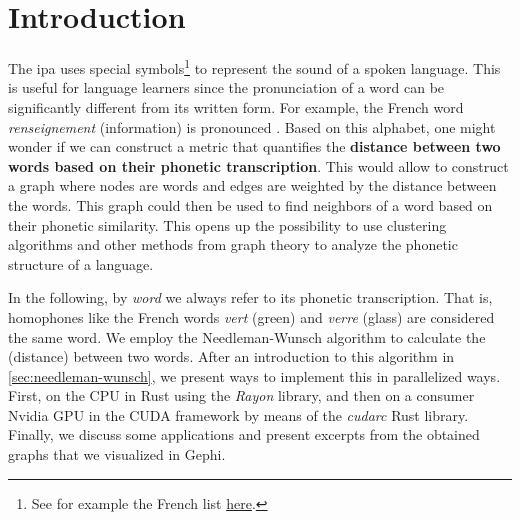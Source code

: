 \section{Introduction}

The \gls{ipa} uses special symbols\footnote{See for example the French list \href{https://en.wikipedia.org/wiki/Help:IPA/French}{here}.} to represent the sound of a spoken language. This is useful for language learners since the pronunciation of a word can be significantly different from its written form. For example, the French word \textit{renseignement} (information) is pronounced . Based on this alphabet, one might wonder if we can construct a metric that quantifies the \textbf{distance between two words based on their phonetic transcription}. This would allow to construct a graph where nodes are words and edges are weighted by the distance between the words. This graph could then be used to find neighbors of a word based on their phonetic similarity. This opens up the possibility to use clustering algorithms and other methods from graph theory to analyze the phonetic structure of a language.

In the following, by \textit{word} we always refer to its phonetic transcription. That is, homophones like the French words \textit{vert}  (green) and \textit{verre}  (glass) are considered the same word. We employ the Needleman-Wunsch algorithm to calculate the  (distance) between two words. After an introduction to this algorithm in \autoref{sec:needleman-wunsch}, we present ways to implement this in parallelized ways. First, on the CPU in Rust using the \textit{Rayon} library, and then on a consumer Nvidia GPU in the CUDA framework by means of the \textit{cudarc} Rust library. Finally, we discuss some applications and present excerpts from the obtained graphs that we visualized in Gephi.


